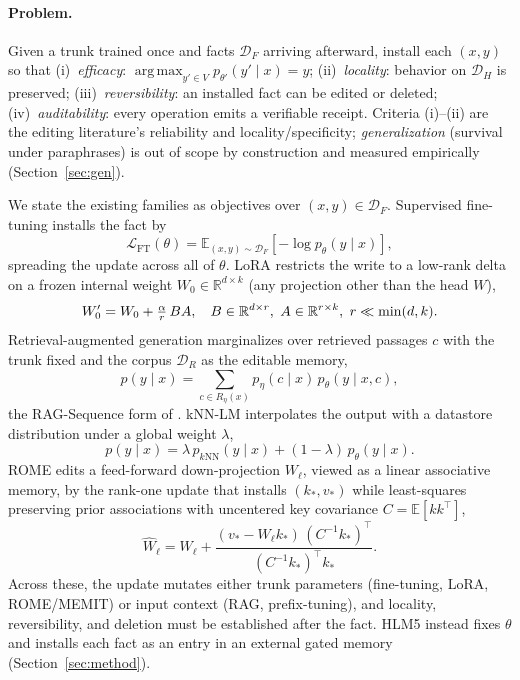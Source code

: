 \documentclass[10pt,twocolumn]{article}
\theoremstyle{remark}
\DeclareMathOperator*{\argmax}{arg\,max}
\newcommand{\R}{\mathbb{R}}
\newcommand{\E}{\mathbb{E}}
\newcommand{\Df}{\mathcal{D}_F}
\newcommand{\Dh}{\mathcal{D}_H}
\newcommand{\Dr}{\mathcal{D}_R}
\begin{document}
\paragraph{Problem.} Given a trunk trained once and facts $\Df$ arriving
afterward, install each $(x,y)$ so that (i)~\emph{efficacy}:
$\argmax_{y'\in V} p_{\theta'}(y'\mid x)=y$; (ii)~\emph{locality}: behavior on
$\Dh$ is preserved; (iii)~\emph{reversibility}: an installed fact can be edited or
deleted; (iv)~\emph{auditability}: every operation emits a verifiable receipt.
Criteria (i)--(ii) are the editing literature's reliability and
locality/specificity; \emph{generalization} (survival under paraphrases) is out
of scope by construction and measured empirically (Section~\ref{sec:gen}).

We state the existing families as objectives over $(x,y)\in\Df$. Supervised
fine-tuning installs the fact by
\begin{equation}
\mathcal{L}_{\mathrm{FT}}(\theta)=\E_{(x,y)\sim\Df}\!\left[-\log p_\theta(y\mid x)\right],
\end{equation}
spreading the update across all of $\theta$. LoRA restricts the write to a
low-rank delta on a frozen internal weight $W_0\in\R^{d\times k}$ (any projection
other than the head $W$),
\begin{equation}
\small
W_0' = W_0 + \tfrac{\alpha}{r}\,BA,\quad B\in\R^{d\times r},\ A\in\R^{r\times k},\ r\ll\min(d,k).
\end{equation}
Retrieval-augmented generation marginalizes over retrieved passages $c$ with the
trunk fixed and the corpus $\Dr$ as the editable memory,
\begin{equation}
p(y\mid x)=\sum_{c\in R_\eta(x)} p_\eta(c\mid x)\, p_\theta(y\mid x,c),
\end{equation}
the RAG-Sequence form of \citet{lewis2020rag}. kNN-LM interpolates the output with
a datastore distribution under a global weight $\lambda$,
\begin{equation}
p(y\mid x)=\lambda\, p_{k\mathrm{NN}}(y\mid x)+(1-\lambda)\,p_\theta(y\mid x).
\end{equation}
ROME edits a feed-forward down-projection $W_\ell$, viewed as a linear
associative memory, by the rank-one update that installs $(k_*,v_*)$ while
least-squares preserving prior associations with uncentered key covariance
$C=\E[kk^{\top}]$,
\begin{equation}
\widehat{W}_\ell = W_\ell + \frac{(v_*-W_\ell k_*)\,(C^{-1}k_*)^{\top}}{(C^{-1}k_*)^{\top}k_*}.
\end{equation}
Across these, the update mutates either trunk parameters (fine-tuning, LoRA,
ROME/MEMIT) or input context (RAG, prefix-tuning), and locality, reversibility,
and deletion must be established after the fact. HLM5 instead fixes $\theta$ and installs each fact as
an entry in an external gated memory (Section~\ref{sec:method}).
\end{document}
